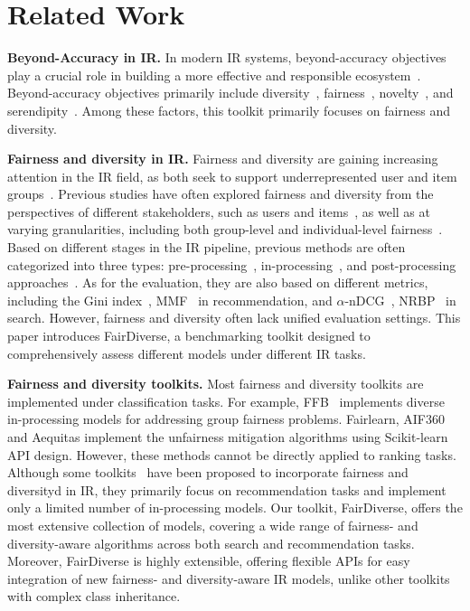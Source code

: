 \section{Related Work}\label{sec:related_work}

\textbf{Beyond-Accuracy in IR.} In modern IR systems, beyond-accuracy objectives play a crucial role in building a more effective and responsible ecosystem~\cite{kaminskas2016diversity, de2023beyond}. Beyond-accuracy objectives primarily include diversity~\cite{PM2_12_sigir}, fairness~\cite{xu2023p, fairrec}, novelty~\cite{hurley2011novelty}, and serendipity~\cite{zhang2012auralist}. Among these factors, this toolkit primarily focuses on fairness and diversity.


\noindent\textbf{Fairness and diversity in IR.} Fairness and diversity are gaining increasing attention in the IR field, as both seek to support underrepresented user and item groups~\cite{li2022fairness, LLM4FairSurvey, wang2021user, PM2_12_sigir}. Previous studies have often explored fairness and diversity from the perspectives of different stakeholders, such as users and items~\cite{abdollahpouri2020multistakeholder}, as well as at varying granularities, including both group-level and individual-level fairness~\cite{biega2018equity, xu2023p}. Based on different stages in the IR pipeline, previous methods are often categorized into three types: pre-processing~\citep{rus2024study}, in-processing~\citep{APR, FairNeg, Reg}, and post-processing approaches~\cite{xu2023p, TaxRank, PM2_12_sigir, dang2012diversity}. As for the evaluation, they are also based on different metrics, including the Gini index~\cite{nips21welf}, MMF~\cite{xu2023p} in recommendation, and $\alpha$-nDCG~\cite{andcg_08_sigir}, NRBP~\cite{nrbp_09_ictir} in search. However, fairness and diversity often lack unified evaluation settings. This paper introduces FairDiverse, a benchmarking toolkit designed to comprehensively assess different models under different IR tasks.

\noindent\textbf{Fairness and diversity toolkits.} Most fairness and diversity toolkits are implemented under classification tasks. For example, FFB~\cite{han2023ffb} implements diverse in-processing models for addressing group fairness problems. Fairlearn\cite{bird2020fairlearn},  AIF360\cite{aif360-oct-2018} and Aequitas\cite{jesus2024aequitas} implement the unfairness mitigation algorithms using Scikit-learn~\cite{kramer2016scikit} API design. However, these methods cannot be directly applied to ranking tasks. Although some toolkits~\cite{recbole2.0} have been proposed to incorporate fairness and diversityd in IR, they primarily focus on recommendation tasks and implement only a limited number of in-processing models. Our toolkit, FairDiverse, offers the most extensive collection of models, covering a wide range of fairness- and diversity-aware algorithms across both search and recommendation tasks. Moreover, FairDiverse is highly extensible, offering flexible APIs for easy integration of new fairness- and diversity-aware IR models, unlike other toolkits with complex class inheritance.